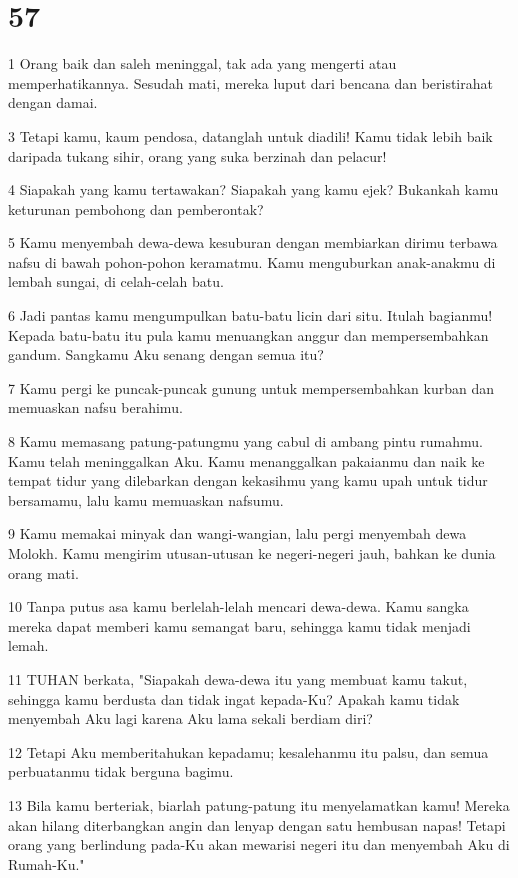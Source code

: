\chapter{57}

\par 1 Orang baik dan saleh meninggal, tak ada yang mengerti atau memperhatikannya. Sesudah mati, mereka luput dari bencana dan beristirahat dengan damai.
\par 3 Tetapi kamu, kaum pendosa, datanglah untuk diadili! Kamu tidak lebih baik daripada tukang sihir, orang yang suka berzinah dan pelacur!
\par 4 Siapakah yang kamu tertawakan? Siapakah yang kamu ejek? Bukankah kamu keturunan pembohong dan pemberontak?
\par 5 Kamu menyembah dewa-dewa kesuburan dengan membiarkan dirimu terbawa nafsu di bawah pohon-pohon keramatmu. Kamu menguburkan anak-anakmu di lembah sungai, di celah-celah batu.
\par 6 Jadi pantas kamu mengumpulkan batu-batu licin dari situ. Itulah bagianmu! Kepada batu-batu itu pula kamu menuangkan anggur dan mempersembahkan gandum. Sangkamu Aku senang dengan semua itu?
\par 7 Kamu pergi ke puncak-puncak gunung untuk mempersembahkan kurban dan memuaskan nafsu berahimu.
\par 8 Kamu memasang patung-patungmu yang cabul di ambang pintu rumahmu. Kamu telah meninggalkan Aku. Kamu menanggalkan pakaianmu dan naik ke tempat tidur yang dilebarkan dengan kekasihmu yang kamu upah untuk tidur bersamamu, lalu kamu memuaskan nafsumu.
\par 9 Kamu memakai minyak dan wangi-wangian, lalu pergi menyembah dewa Molokh. Kamu mengirim utusan-utusan ke negeri-negeri jauh, bahkan ke dunia orang mati.
\par 10 Tanpa putus asa kamu berlelah-lelah mencari dewa-dewa. Kamu sangka mereka dapat memberi kamu semangat baru, sehingga kamu tidak menjadi lemah.
\par 11 TUHAN berkata, "Siapakah dewa-dewa itu yang membuat kamu takut, sehingga kamu berdusta dan tidak ingat kepada-Ku? Apakah kamu tidak menyembah Aku lagi karena Aku lama sekali berdiam diri?
\par 12 Tetapi Aku memberitahukan kepadamu; kesalehanmu itu palsu, dan semua perbuatanmu tidak berguna bagimu.
\par 13 Bila kamu berteriak, biarlah patung-patung itu menyelamatkan kamu! Mereka akan hilang diterbangkan angin dan lenyap dengan satu hembusan napas! Tetapi orang yang berlindung pada-Ku akan mewarisi negeri itu dan menyembah Aku di Rumah-Ku."
